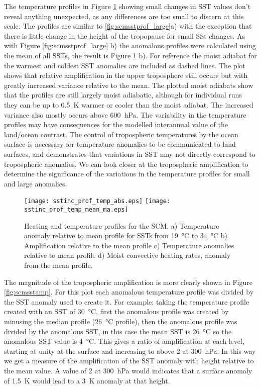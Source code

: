 The temperature profiles in Figure \ref{fig:scmsstinc_prof} showing small 
changes in SST values don't reveal anything unexpected, as any differences are 
too small to discern at this scale. The profiles are similar to 
\ref{fig:scmsstprof_large}a) with the exception that there is little change in 
the height of the tropopause for small SSt changes. As with Figure 
\ref{fig:scmsstprof_large} b) the anomalous profiles were calculated using the 
mean of all SSTs, the result is Figure \ref{fig:scmsstinc_prof} b). For 
reference the moist adiabat for the warmest and coldest SST anomalies are 
included as dashed lines. The plot shows that relative amplification in the 
upper troposphere still occurs but with greatly increased variance relative to 
the mean. The plotted moist adiabats show that the profiles are still largely 
moist adiabatic, although for individual runs they can be up to 
\SI{0.5}{\kelvin} warmer or cooler than the moist adiabat. The increased 
variance also mostly occurs above \SI{600}{\hecto\pascal}. The variability in 
the temperature profiles may have consequences for the modelled interannual 
value of the land/ocean contrast. The control of tropospheric temperatures by 
the ocean surface is necessary for temperature anomalies to be communicated to 
land surfaces, and demonstrates that variations in SST may not directly 
correspond to tropospheric anomalies. We can look closer at the tropospheric 
amplification to determine the significance of the variations in the temperature 
profiles for small and large anomalies.


\begin{figure}[ht]
\texttt{[image: sstinc\_prof\_temp\_abs.eps]}
\texttt{[image: sstinc\_prof\_temp\_mean\_ma.eps]}
\caption{Heating and temperature profiles for the SCM. a) Temperature anomaly 
	relative to mean profile for SSTs from \SI{19}{\degreeCelsius} to 
	\SI{34}{\degreeCelsius} b) Amplification relative to the mean profile c) 
	Temperature anomalies relative to mean profile d) Moist convective heating 
rates, anomaly from the mean profile.}
\label{fig:scmsstinc_prof}
\end{figure}

The magnitude of the tropospheric amplification is more clearly shown in Figure 
\ref{fig:scmsstamp}. For this plot each anomalous temperature profile was 
divided by the SST anomaly used to create it. For example; taking the 
temperature profile created with an SST of \SI{30}{\degreeCelsius}, first the 
anomalous profile was created by minusing the median profile 
(\SI{26}{\degreeCelsius} profile), then the anomalous profile was divided by the 
anomalous SST, in this case the mean SST is \SI{26}{\celsius} so the anomalous 
SST value is \SI{4}{\celsius}.  This gives a ratio of amplification at each 
level, starting at unity at the surface and increasing to above 2 at 
\SI{300}{\hecto\pascal}.  In this way we get a measure of the amplification of 
the SST anomaly with height relative to the mean value.  A value of 2 at 
\SI{300}{\hecto\pascal} would indicates that a surface anomaly of 
\SI{1.5}{\kelvin} would lead to a \SI{3}{\kelvin} anomaly at that height.  

